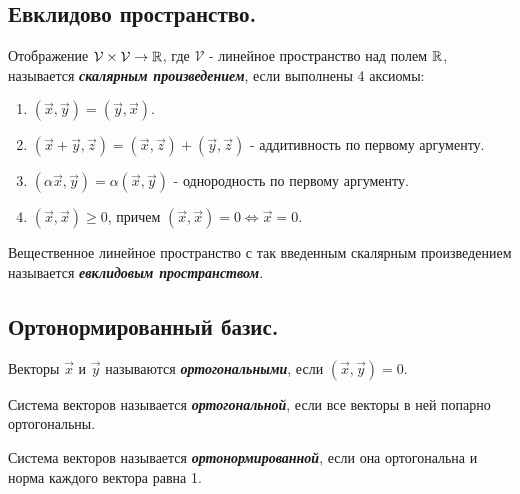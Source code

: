 \subsection{
    Евклидово пространство.
}

\begin{definition}
    Отображение $\mathcal{V} \times \mathcal{V} \to \mathbb{R}$, где $\mathcal{V}$ - линейное пространство над полем $\mathbb{R}$, называется \textbf{\textit{скалярным произведением}}, если выполнены 4 аксиомы:
    \begin{enumerate}[nosep]
        \item $(\vec{x}, \vec{y}) = (\vec{y}, \vec{x})$.
        \item $(\vec{x} + \vec{y}, \vec{z}) = (\vec{x}, \vec{z}) + (\vec{y}, \vec{z})$ - аддитивность по первому аргументу.
        \item $(\alpha \vec{x}, \vec{y}) = \alpha(\vec{x}, \vec{y})$ - однородность по первому аргументу.
        \item $(\vec{x}, \vec{x}) \geq 0$, причем $(\vec{x}, \vec{x}) = 0 \iff \vec{x} = 0$.
    \end{enumerate}
\end{definition}

\begin{definition}
    Вещественное линейное пространство с так введенным скалярным произведением называется \textbf{\textit{евклидовым пространством}}.
\end{definition}

\subsection{
    Ортонормированный базис.
}

\begin{definition}
    Векторы $\vec{x}$ и $\vec{y}$ называются \textbf{\textit{ортогональными}}, если $(\vec{x}, \vec{y}) = 0$.
\end{definition}

\begin{definition}
    Система векторов называется \textit{\textbf{ортогональной}}, если все векторы в ней попарно ортогональны.
\end{definition}

\begin{definition}
    Система векторов называется \textit{\textbf{ортонормированной}}, если она ортогональна и норма каждого вектора равна 1.
\end{definition}
